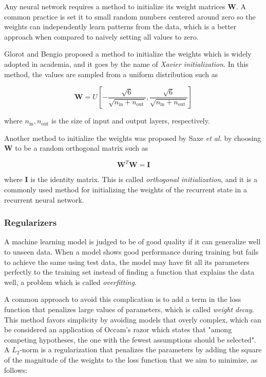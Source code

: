 \documentclass{kththesis}
\begin{document}
Any neural network requires a method to initialize its weight matrices $\mathbf{W}$. A common practice is set it to small random numbers centered around zero so the weights can independently learn patterns from the data, which is a better approach when compared to naively setting all values to zero. 

Glorot and Bengio\citep{glorot2010understanding} proposed a method to initialize the weights which is widely adopted in academia, and it goes by the name of \emph{Xavier initialization}. In this method, the values are sampled from a uniform distribution such as

\begin{equation}
\mathbf{W} = \mathit{U}[-\frac{\sqrt{6}}{\sqrt{n_\text{in}+n_\text{out}}}, \frac{\sqrt{6}}{\sqrt{n_\text{in}+n_\text{out}}}] 
\end{equation}

where $n_\text{in}, n_\text{out}$ is the size of input and output layers, respectively. 

Another method to initialize the weights was proposed by Saxe \emph{et al.}\citep{saxe2013exact} by choosing $\mathbf{W}$ to be a random orthogonal matrix such as 

\begin{equation}
\mathbf{W}^T\mathbf{W} = \mathbf{I}
\end{equation}

where $\mathbf{I}$ is the identity matrix. This is called \emph{orthogonal initialization}, and it is a commonly used method for initializing the weights of the recurrent state in a recurrent neural network.

\subsubsection{Regularizers}

A machine learning model is judged to be of good quality if it can generalize well to unseen data. When a model shows good performance during training but fails to achieve the same using test data, the model may have fit all its parameters perfectly to the training set instead of finding a function that explains the data well, a problem which is called \emph{overfitting}. 

A common approach to avoid this complication is to add a term in the loss function that penalizes large values of parameters, which is called \emph{weight decay}. This method favors simplicity by avoiding models that overly complex, which can be considered an application of Occam's razor which states that "among competing hypotheses, the one with the fewest assumptions should be selected". A $L_2$-norm is a regularization that penalizes the parameters by adding the square of the magnitude of the weights to the loss function that we aim to minimize\citep{phaisangittisagul2016analysis}, as follows:
\end{document}
